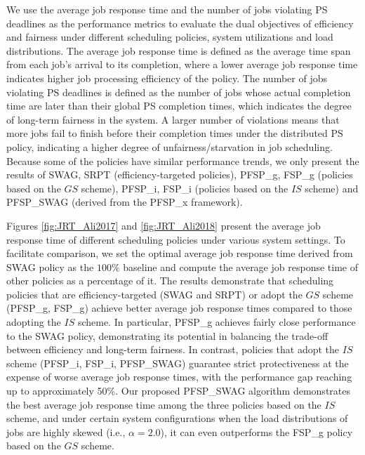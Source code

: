 We use the average job response time and the number of jobs violating PS deadlines as the performance metrics to evaluate the dual objectives of efficiency and fairness under different scheduling policies, system utilizations and load distributions. The average job response time is defined as the average time span from each job's arrival to its completion, where a lower average job response time indicates higher job processing efficiency of the policy. The number of jobs violating PS deadlines is defined as the number of jobs whose actual completion time are later than their global PS completion times, which indicates the degree of long-term fairness in the system. A larger number of violations means that more jobs fail to finish before their completion times under the distributed PS policy, indicating a higher degree of unfairness/starvation in job scheduling. Because some of the policies have similar performance trends, we only present the results of SWAG, SRPT (efficiency-targeted policies), PFSP\_g, FSP\_g (policies based on the $GS$ scheme), PFSP\_i, FSP\_i (policies based on the $IS$ scheme) and PFSP\_SWAG (derived from the PFSP\_x framework).

Figures \ref{fig:JRT_Ali2017} and \ref{fig:JRT_Ali2018} present the average job response time of different scheduling policies under various system settings. To facilitate comparison, we set the optimal average job response time derived from SWAG policy as the $100\%$ baseline and compute the average job response time of other policies as a percentage of it. The results demonstrate that scheduling policies that are efficiency-targeted (SWAG and SRPT) or adopt the $GS$ scheme (PFSP\_g, FSP\_g) achieve better average job response times compared to those adopting the $IS$ scheme. In particular, PFSP\_g achieves fairly close performance to the SWAG policy, demonstrating its potential in balancing the trade-off between efficiency and long-term fairness. In contrast, policies that adopt the $IS$ scheme (PFSP\_i, FSP\_i, PFSP\_SWAG) guarantee strict protectiveness at the expense of worse average job response times, with the performance gap reaching up to approximately 50\%. Our proposed PFSP\_SWAG algorithm demonstrates the best average job response time among the three policies based on the $IS$ scheme, and under certain system configurations when the load distributions of jobs are highly skewed (i.e., $\alpha=2.0$), it can even outperforms the FSP\_g policy based on the $GS$ scheme.


